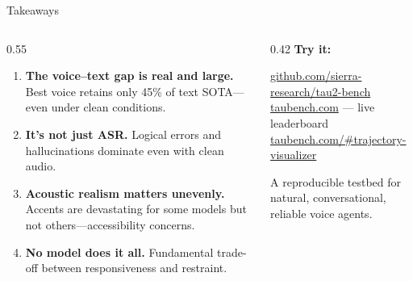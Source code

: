 \documentclass[aspectratio=169]{beamer}
\begin{document}
\begin{frame}{Takeaways}

  \begin{columns}[T]
    \begin{column}{0.55\textwidth}
      \begin{enumerate}
        \item \textbf{The voice--text gap is real and large.} Best voice retains only 45\% of text SOTA---even under clean conditions.

        \vspace{0.3em}
        \item \textbf{It's not just ASR.} Logical errors and hallucinations dominate even with clean audio.

        \vspace{0.3em}
        \item \textbf{Acoustic realism matters unevenly.} Accents are devastating for some models but not others---accessibility concerns.

        \vspace{0.3em}
        \item \textbf{No model does it all.} Fundamental trade-off between responsiveness and restraint.
      \end{enumerate}
    \end{column}
    \begin{column}{0.42\textwidth}
      \textbf{Try it:}

      \vspace{0.3em}
      {\small
      \href{https://github.com/sierra-research/tau2-bench}{\textcolor{SierraGreen}{github.com/sierra-research/tau2-bench}}\\[0.4em]
      \href{https://taubench.com}{\textcolor{SierraGreen}{taubench.com}} --- live leaderboard\\[0.4em]
      \href{https://taubench.com/\#trajectory-visualizer}{\textcolor{SierraGreen}{taubench.com/\#trajectory-visualizer}}
      \par}

      \vspace{1.0em}
      {
      \setlength{\fboxsep}{8pt}
      \colorbox{SierraDarkGreen}{%
        \parbox{0.92\linewidth}{\centering\textcolor{SierraWhite}{\intermedium A reproducible testbed for natural, conversational, reliable voice agents.}}%
      }
      }
    \end{column}
  \end{columns}

\end{frame}
\end{document}
